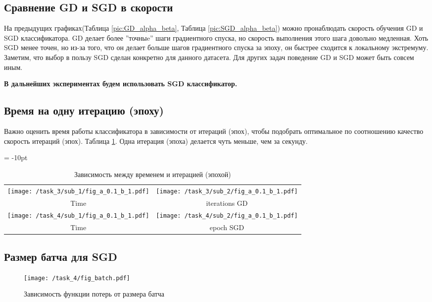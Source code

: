 \documentclass[12pt,fleqn]{article}
\begin{document}
\subsection{Сравнение GD и SGD в скорости}
На предыдущих графиках(Таблица \ref{pic:GD_alpha_beta}, Таблица \ref{pic:SGD_alpha_beta})
можно пронаблюдать скорость обучения GD и SGD классификатора. GD делает более ''точныe''
шаги градиентного спуска, но скорость выполнения этого шага довольно медленная. 
Хоть SGD менее точен, но из-за того,
что он делает больше шагов градиентного спуска за эпоху, он быстрее сходится к локальному экстремуму. 
Заметим, что выбор в пользу SGD сделан конкретно для данного датасета. Для других задач 
поведение GD и SGD может быть совсем иным.

\textbf{В дальнейших экспериментах будем использовать SGD классификатор.}

\subsection{Время на одну итерацию (эпоху)}
Важно оценить время работы классификатора в зависимости от итераций (эпох), чтобы подобрать
оптимальное по соотношению качество скорость итераций (эпох). Таблица \ref{pic:time_iter}.
Одна итерация (эпоха) делается чуть меньше, чем за секунду.

\begin{table}[htb]

    \centering
    \tabcolsep = -10pt
    \begin{tabular}{cc}
        \texttt{[image: /task\_3/sub\_1/fig\_a\_0.1\_b\_1.pdf]}  & 
        \texttt{[image: /task\_3/sub\_2/fig\_a\_0.1\_b\_1.pdf]} \\
        Time & iterations GD \\
         \texttt{[image: /task\_4/sub\_1/fig\_a\_0.1\_b\_1.pdf]} &
         \texttt{[image: /task\_4/sub\_2/fig\_a\_0.1\_b\_1.pdf]} \\
         Time & epoch SGD
    \end{tabular}
    \caption{Зависимость между временем и итерацией (эпохой)}
    \label{pic:time_iter}
\end{table}

\newpage
\subsection{Размер батча для SGD}
\begin{wrapfigure}[13]{r}{0.5\textwidth}
    \texttt{[image: /task\_4/fig\_batch.pdf]} 
    \caption{Зависимость функции потерь от размера батча}
    \label{pic:batch}
\end{wrapfigure}
\end{document}
